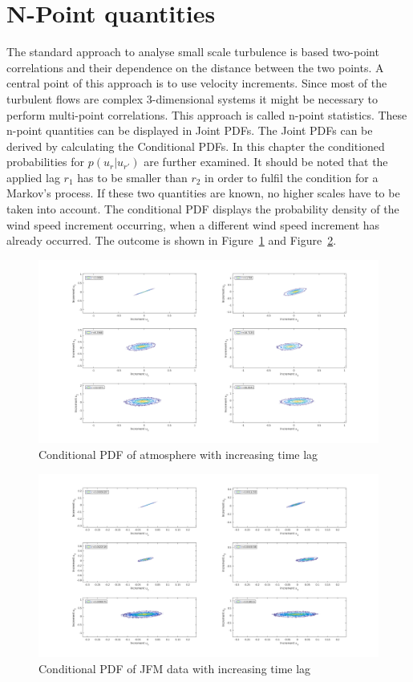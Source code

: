 \documentclass[12pt]{article}
\begin{document}
\section{N-Point quantities}
The standard approach to analyse small scale turbulence is based two-point correlations and their dependence on the distance between the two points. A central point of this approach is to use velocity increments. Since most of the turbulent flows are complex 3-dimensional systems it might be necessary to perform multi-point correlations. This approach is called n-point statistics. These n-point quantities can be displayed in Joint PDFs. The Joint PDFs can be derived by calculating the Conditional PDFs. In this chapter the conditioned probabilities for $p(u_r | u_{r'})$ are further examined. It should be noted that the applied lag $r_1$ has to be smaller than $r_2$ in order to fulfil the condition for a Markov's process. If these two quantities are known, no higher scales have to be taken into account. The conditional PDF displays the probability density of the wind speed increment occurring, when a different wind speed increment has already occurred.\cite{npoint} The outcome is shown in Figure~\ref{fig:npoint_atmo} and Figure~\ref{fig:npoint_center}.
\begin{figure}[H]
  \centering
  \includegraphics[width=1\linewidth]{figures/atmo_npoint.png}
\caption{Conditional PDF of atmosphere with increasing time lag}
\label{fig:npoint_atmo}
\end{figure}
\begin{figure}[H]
  \centering
  \includegraphics[width=1\linewidth]{figures/labdata_npoint.png}
\caption{Conditional PDF of JFM data with increasing time lag}
\label{fig:npoint_center}
\end{figure}
\end{document}
